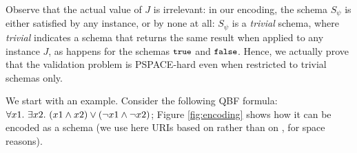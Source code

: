 Observe that the actual value of $J$ is irrelevant: in our encoding, the schema $S_{\psi}$ is either satisfied by
any instance, or by none at all: $S_{\psi}$ is a \emph{trivial} schema, where \emph{trivial} indicates a schema
that returns the same result when applied to any instance $J$, as happens for the schemas
$\mbox{\tt{\small true}}$ and $\mbox{\tt{\small false}}$.
Hence, we actually prove that the validation problem is PSPACE-hard even when restricted to trivial schemas only.

We start with an example.
Consider the following QBF formula: $\forall x1.\ \exists x2.\ (x1 \wedge x2) \vee (\neg x1 \wedge \neg x2)$;
Figure \ref{fig:encoding} shows how it can be encoded as a {\JS} schema (we use here URIs based on  rather than on , for space reasons).


